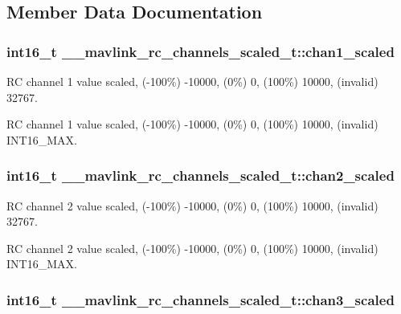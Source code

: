 \subsection{Member Data Documentation}
\hypertarget{struct____mavlink__rc__channels__scaled__t_a2d350897e12b0008208e61a031f01270}{
\subsubsection[{chan1\+\_\+scaled}]{\setlength{\rightskip}{0pt plus 5cm}int16\+\_\+t \+\_\+\+\_\+mavlink\+\_\+rc\+\_\+channels\+\_\+scaled\+\_\+t\+::chan1\+\_\+scaled}}\label{struct____mavlink__rc__channels__scaled__t_a2d350897e12b0008208e61a031f01270}


R\+C channel 1 value scaled, (-\/100\%) -\/10000, (0\%) 0, (100\%) 10000, (invalid) 32767. 

R\+C channel 1 value scaled, (-\/100\%) -\/10000, (0\%) 0, (100\%) 10000, (invalid) I\+N\+T16\+\_\+\+M\+A\+X. \hypertarget{struct____mavlink__rc__channels__scaled__t_a8ca88934095102f7195b4e5ab88ecd5c}{
\subsubsection[{chan2\+\_\+scaled}]{\setlength{\rightskip}{0pt plus 5cm}int16\+\_\+t \+\_\+\+\_\+mavlink\+\_\+rc\+\_\+channels\+\_\+scaled\+\_\+t\+::chan2\+\_\+scaled}}\label{struct____mavlink__rc__channels__scaled__t_a8ca88934095102f7195b4e5ab88ecd5c}


R\+C channel 2 value scaled, (-\/100\%) -\/10000, (0\%) 0, (100\%) 10000, (invalid) 32767. 

R\+C channel 2 value scaled, (-\/100\%) -\/10000, (0\%) 0, (100\%) 10000, (invalid) I\+N\+T16\+\_\+\+M\+A\+X. \hypertarget{struct____mavlink__rc__channels__scaled__t_a1f6f236dabbe2174233f2bf4e16f3c7d}{
\subsubsection[{chan3\+\_\+scaled}]{\setlength{\rightskip}{0pt plus 5cm}int16\+\_\+t \+\_\+\+\_\+mavlink\+\_\+rc\+\_\+channels\+\_\+scaled\+\_\+t\+::chan3\+\_\+scaled}}\label{struct____mavlink__rc__channels__scaled__t_a1f6f236dabbe2174233f2bf4e16f3c7d}


